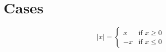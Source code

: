 \documentclass[10pt]{article}
\begin{document}
\section{Cases}

\begin{equation*}
|x|= 
\begin{cases} x & \text{if } x\geq0
\\
-x &\text{if } x\le 0
\end{cases}
\end{equation*}
\end{document}
